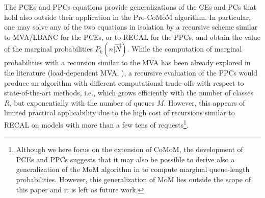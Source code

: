 \documentclass[journal,twocolumn,9.5pt]{IEEEtran}
\newcommand{\comom}[1]{\bar{#1}}
\begin{document}
The PCEs and PPCs equations provide generalizations of the CEs and PCs that hold also outside their application in the Pro-CoMoM algorithm. In particular, one may solve any of the two equations in isolation by a recursive scheme similar to MVA/LBANC for the PCEs, or to RECAL for the PPCs, and obtain the value of the marginal probabilities $P_k(n|\vec N)$. While the computation of marginal probabilities with a recursion similar to the MVA has been already explored in the literature (load-dependent MVA, \cite{ReiL80}), a recursive evaluation of the PPCs would produce an algorithm with different computational trade-offs with respect to state-of-the-art methods, i.e., which grows efficiently with the number of classes $R$, but exponentially with the number of queues $M$. However, this appears of limited practical applicability due to the high cost of recursions similar to RECAL on models with more than a few tens of requests\footnote{Although we here focus on the extension of CoMoM, the development of PCEs and PPCs suggests that it may also be possible to derive also a generalization of the MoM algorithm in \cite{Cas06b} to compute marginal queue-length probabilities. However, this generalization of MoM lies outside the scope of this paper and it is left as future work.}.
\end{document}
